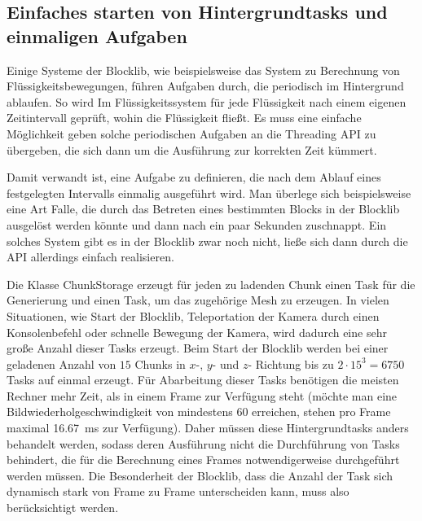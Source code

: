\subsection{Einfaches starten von Hintergrundtasks und einmaligen Aufgaben}
Einige Systeme der Blocklib, wie beispielsweise das System zu Berechnung von Flüssigkeitsbewegungen, führen Aufgaben durch, die periodisch im Hintergrund ablaufen. So wird Im Flüssigkeitssystem für jede Flüssigkeit nach einem eigenen Zeitintervall geprüft, wohin die Flüssigkeit fließt. Es muss eine einfache Möglichkeit geben solche periodischen Aufgaben an die Threading API zu übergeben, die sich dann um die Ausführung zur korrekten Zeit kümmert.

Damit verwandt ist, eine Aufgabe zu definieren, die nach dem Ablauf eines festgelegten Intervalls einmalig ausgeführt wird. Man überlege sich beispielsweise eine Art Falle, die durch das Betreten eines bestimmten Blocks in der Blocklib ausgelöst werden könnte und dann nach ein paar Sekunden zuschnappt. Ein solches System gibt es in der Blocklib zwar noch nicht, ließe sich dann durch die API allerdings einfach realisieren.

Die Klasse ChunkStorage erzeugt für jeden zu ladenden Chunk einen Task für die Generierung und einen Task, um das zugehörige Mesh zu erzeugen. In vielen Situationen, wie  Start der Blocklib, Teleportation der Kamera durch einen Konsolenbefehl oder schnelle Bewegung der Kamera, wird dadurch eine sehr große Anzahl dieser Tasks erzeugt. Beim Start der Blocklib werden bei einer geladenen Anzahl von $15$ Chunks in  $x$-, $y$- und $z$- Richtung bis zu $2\cdot15^3=6750$  Tasks auf einmal erzeugt. Für Abarbeitung dieser Tasks benötigen die meisten Rechner mehr Zeit, als in einem Frame zur Verfügung steht (möchte man eine Bildwiederholgeschwindigkeit von mindestens \SI{60}{\fps} erreichen, stehen pro Frame maximal \SI{16,67}{\milli\second} zur Verfügung). Daher müssen diese Hintergrundtasks anders behandelt werden, sodass deren Ausführung nicht die Durchführung von Tasks behindert, die für die Berechnung eines Frames notwendigerweise durchgeführt werden müssen. Die Besonderheit der Blocklib, dass die Anzahl der Task sich dynamisch stark von Frame zu Frame unterscheiden kann, muss also berücksichtigt werden.